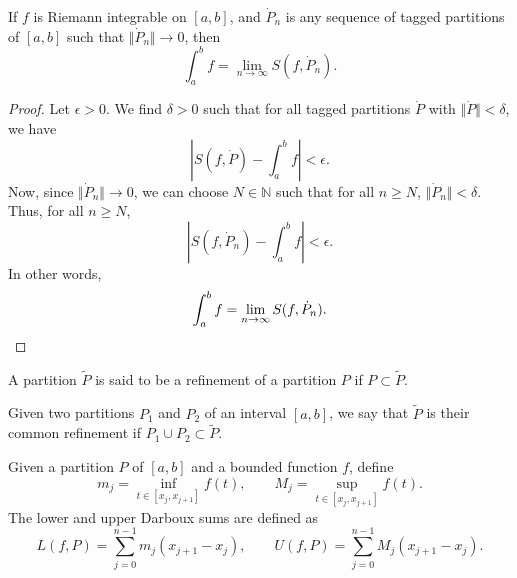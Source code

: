 \documentclass[11pt]{article}
\def\N{\mathbb{N}}
\theoremstyle{definition}
\theoremstyle{remark}
\numberwithin{equation}{module}
\begin{document}
    \begin{theorem}
        If $f$ is Riemann integrable on $[a, b]$, and $\dot{P}_n$ is any sequence of
        tagged partitions of $[a, b]$ such that $\Vert\dot{P}_n\Vert \to 0$, then \[
            \int_a^b f = \lim_{n \to \infty} S(f, \dot{P}_n).
        \] 
    \end{theorem}
    \begin{proof}
        Let $\epsilon > 0$. We find $\delta > 0$ such that for all tagged partitions
        $\dot{P}$ with $\Vert\dot{P}\Vert < \delta$, we have \[
            |S(f, \dot{P})  - \int_a^b f| < \epsilon.
        \] Now, since $\Vert\dot{P}_n\Vert \to 0$, we can choose $N \in \N$ such
        that for all $n \geq N$, $\Vert\dot{P}_n\Vert < \delta$. Thus, for all $n
        \geq N$, \[
            |S(f, \dot{P}_n)  - \int_a^b f| < \epsilon.
        \] In other words, \[
            \int_a^b f = \lim_{n \to \infty} S(f, \dot{P}_n). \qedhere
        \] 
    \end{proof}


    \begin{definition}[Refinement]
        A partition $\tilde{P}$ is said to be a refinement of a partition $P$ if
        $P\subset \tilde{P}$.
    \end{definition}

    \begin{definition}
        Given two partitions $P_1$ and $P_2$ of an interval $[a, b]$, we say that
        $\tilde{P}$ is their common refinement if $P_1 \cup P_2 \subset \tilde{P}$.
    \end{definition}

    \begin{definition}
        Given a partition $P$ of $[a, b]$ and a bounded function $f$, define \[
            m_j = \inf_{t \in [x_{j}, x_{j + 1}]} f(t), \qquad
            M_j = \sup_{t \in [x_{j}, x_{j + 1}]} f(t).
        \] The lower and upper Darboux sums are defined as \[
            L(f, P) = \sum_{j = 0}^{n - 1} m_j(x_{j + 1} - x_j), \qquad
            U(f, P) = \sum_{j = 0}^{n - 1} M_j(x_{j + 1} - x_j).
        \] 
    \end{definition}
\end{document}
